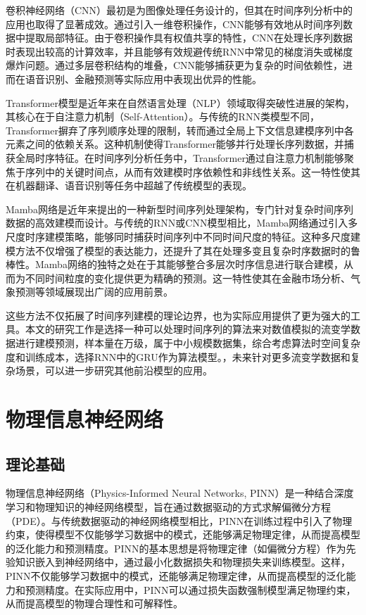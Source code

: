 卷积神经网络（CNN）最初是为图像处理任务设计的，但其在时间序列分析中的应用也取得了显著成效\cite{lecun1998gradient}。通过引入一维卷积操作，CNN能够有效地从时间序列数据中提取局部特征。由于卷积操作具有权值共享的特性，CNN在处理长序列数据时表现出较高的计算效率，并且能够有效规避传统RNN中常见的梯度消失或梯度爆炸问题。通过多层卷积结构的堆叠，CNN能够捕获更为复杂的时间依赖性，进而在语音识别、金融预测等实际应用中表现出优异的性能\cite{li2021survey}。

Transformer模型是近年来在自然语言处理（NLP）领域取得突破性进展的架构，其核心在于自注意力机制（Self-Attention）\cite{Vaswanietal2017Attention}。与传统的RNN类模型不同，Transformer摒弃了序列顺序处理的限制，转而通过全局上下文信息建模序列中各元素之间的依赖关系。这种机制使得Transformer能够并行处理长序列数据，并捕获全局时序特征。在时间序列分析任务中，Transformer通过自注意力机制能够聚焦于序列中的关键时间点，从而有效建模时序依赖性和非线性关系。这一特性使其在机器翻译、语音识别等任务中超越了传统模型的表现。

Mamba网络是近年来提出的一种新型时间序列处理架构，专门针对复杂时间序列数据的高效建模而设计\cite{gu2023mamba}。与传统的RNN或CNN模型相比，Mamba网络通过引入多尺度时序建模策略，能够同时捕获时间序列中不同时间尺度的特征。这种多尺度建模方法不仅增强了模型的表达能力，还提升了其在处理多变且复杂时序数据时的鲁棒性。Mamba网络的独特之处在于其能够整合多层次时序信息进行联合建模，从而为不同时间粒度的变化提供更为精确的预测。这一特性使其在金融市场分析、气象预测等领域展现出广阔的应用前景。

这些方法不仅拓展了时间序列建模的理论边界，也为实际应用提供了更为强大的工具。本文的研究工作是选择一种可以处理时间序列的算法来对数值模拟的流变学数据进行建模预测，样本量在万级，属于中小规模数据集，综合考虑算法时空间复杂度和训练成本，选择RNN中的GRU作为算法模型。，未来针对更多流变学数据和复杂场景，可以进一步研究其他前沿模型的应用。
\section{物理信息神经网络}
\subsection{理论基础}
物理信息神经网络（Physics-Informed Neural Networks, PINN）是一种结合深度学习和物理知识的神经网络模型，旨在通过数据驱动的方式求解偏微分方程（PDE）\cite{raissiPhysicsinformedNeuralNetworks2019a}。与传统数据驱动的神经网络模型相比，PINN在训练过程中引入了物理约束，使得模型不仅能够学习数据中的模式，还能够满足物理定律，从而提高模型的泛化能力和预测精度。PINN的基本思想是将物理定律（如偏微分方程）作为先验知识嵌入到神经网络中，通过最小化数据损失和物理损失来训练模型。这样，PINN不仅能够学习数据中的模式，还能够满足物理定律，从而提高模型的泛化能力和预测精度。在实际应用中，PINN可以通过损失函数强制模型满足物理约束，从而提高模型的物理合理性和可解释性。

